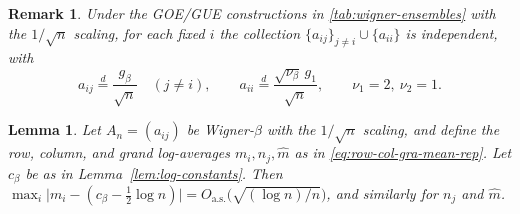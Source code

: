 \documentclass[11pt,a4paper]{article}
\newtheorem{lemma}[theorem]{Lemma}
\newtheorem{remark}{Remark}[section]
\newcommand{\be}{\begin{equation}}
\newcommand{\ee}{\end{equation}}
\begin{document}
\begin{remark}\label{rem:wigner-entry-laws}
Under the GOE/GUE constructions in \cref{tab:wigner-ensembles} with the $1/\sqrt n$ scaling, for each fixed $i$ the collection $\{a_{ij}\}_{j\ne i}\cup\{a_{ii}\}$ is independent, with
\be
a_{ij}\stackrel{d}{=} \frac{g_\beta}{\sqrt n}\quad (j\ne i),
\qquad
a_{ii}\stackrel{d}{=} \frac{\sqrt{\nu_\beta}\,g_1}{\sqrt n},
\qquad
\nu_1=2,\ \nu_2=1.
\ee
\end{remark}
\begin{lemma}\label{lem:log-mean-wigner}
Let $A_n = (a_{ij})$ be Wigner-$\beta$ with the $1/\sqrt n$ scaling, and define the row, column, and grand log-averages $m_i,n_j,\hat{m}$ as in \cref{eq:row-col-gra-mean-rep}. Let $c_\beta$ be as in Lemma~\ref{lem:log-constants}. Then $\max_i\big|m_i-(c_\beta-\tfrac12\log n)\big|=O_{\mathrm{a.s.}}\!\big(\sqrt{(\log n)/n}\big)$, and similarly for $n_j$ and $\hat{m}$.
\end{lemma}
\end{document}
